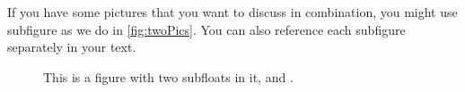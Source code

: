 \documentclass{acm_proc_article-sp}
\begin{document}
If you have some pictures
that you want to discuss in combination,
you might use subfigure
as we do in \autoref{fig:twoPics}.
You can also reference each subfigure separately
in your text.

\begin{figure}
  \hfill
  \caption{This is a figure
    with two subfloats in it,
    \protect{}
    and \protect{}.}
  \label{fig:twoPics}
 \end{figure}


\end{document}
